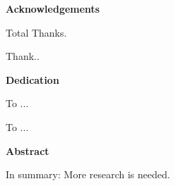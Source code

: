\newpage %

\Huge {\bf Acknowledgements} \\
\normalsize

Total Thanks.

\vspace*{1.0 cm}

\large Thank..\normalsize

\newpage %

\Huge {\bf Dedication}

\vspace*{7.0 cm}

\begin{center}
\large To ...

\vspace*{3.0 cm}

To ...
\end{center}

\normalsize


\newpage %

\Huge{{\bf Abstract}} \\
\normalsize

\vspace*{4.0 cm}

In summary: More research is needed.

\newpage %

\tableofcontents
\listoftables
\listoffigures
\newpage

